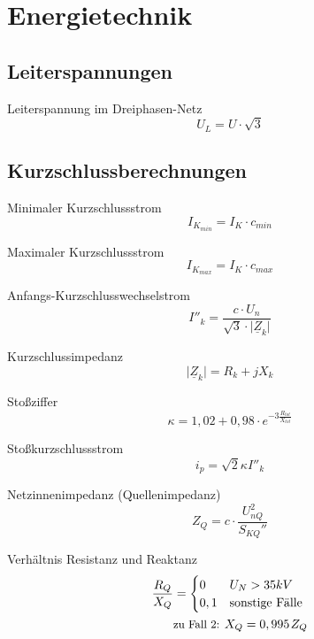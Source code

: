 \documentclass[11pt, a4paper, final, fleqn, twocolumn]{article}
\numberwithin{equation}{subsection}
\begin{document}
\section{Energietechnik}

\subsection{Leiterspannungen}

Leiterspannung im Dreiphasen-Netz
\begin{equation}
    U_L = U \cdot \sqrt{3}
\end{equation}


\subsection{Kurzschlussberechnungen}

Minimaler Kurzschlussstrom
\begin{equation}
    I_{K_{min}} = I_K \cdot c_{min}
\end{equation}

\noindent Maximaler Kurzschlussstrom
\begin{equation}
    I_{K_{max}} = I_K \cdot c_{max}
\end{equation}

\noindent Anfangs-Kurzschlusswechselstrom
\begin{equation}
    I''_k = \dfrac{c \cdot U_n}{\sqrt{3}\cdot \lvert \underline{Z}_k \rvert}
\end{equation}

\noindent Kurzschlussimpedanz
\begin{equation}
    \lvert \underline{Z}_k \rvert = R_k + j X_k
\end{equation}

\noindent Stoßziffer
\begin{equation}
    \kappa = 1,02 + 0,98 \cdot e^{-3 \frac{R_{tot}}{X_{tot}}}
\end{equation}

\noindent Stoßkurzschlussstrom
\begin{equation}
    i_p = \sqrt{2} \kappa I''_k
\end{equation}

\noindent Netzinnenimpedanz (Quellenimpedanz)
\begin{equation}
    Z_{Q} = c \cdot \frac{U_{nQ}^2}{S_{KQ}''}
\end{equation}

\noindent Verhältnis Resistanz und Reaktanz
\begin{equation}
\begin{split}
\frac{R_Q}{X_Q} & =
\begin{cases}
0 & U_N > 35 kV \\
0,1 & \text{sonstige Fälle}
\end{cases} \\
& \text{\small zu Fall 2: } X_Q = 0,995 \hspace{0.1em} Z_Q
\end{split}
\end{equation}
\end{document}
